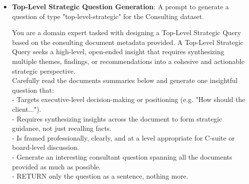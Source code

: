 \documentclass[12pt,twoside]{report}
\begin{document}
\begin{itemize}
\begin{colquote}
    Carefully read the document summary below and generate one well-structured question that: \\
    - Requires aggregation, such as averaging, totaling, or summarizing metrics across time periods, business units, or case examples. \\
    - May involve either numerical aggregation (e.g. averages, totals, trends) or conceptual aggregation (e.g. common success factors across initiatives). \\
    - Is professionally worded, precise, and answerable using the document's content. \\
    - Generate an interesting consultant question spanning all the documents provided as much as possible. \\
    - RETURN only the question as a sentence, nothing more. \\

    Examples: \\
    - "Calculate the average EBITDA improvement for retail firms implementing cost-cutting initiatives as recommended in Deloitte's 2021 and 2022 reports." \\
    - "What are the most commonly cited success factors for digital transformation across Bain's 2022 and 2023 strategy reports?" \\

    The documents information: \\
    \{topics_and_summaries\}
    \end{colquote}

    \item \textbf{Top-Level Strategic Question Generation}: A prompt to generate a question of type "top-level-strategic" for the Consulting dataset.
    \begin{colquote}
    You are a domain expert tasked with designing a Top-Level Strategic Query based on the consulting document metadata provided. A Top-Level Strategic Query seeks a high-level, open-ended insight that requires synthesizing multiple themes, findings, or recommendations into a cohesive and actionable strategic perspective. \\

    Carefully read the documents summaries below and generate one insightful question that: \\
    - Targets executive-level decision-making or positioning (e.g. "How should the client..."). \\
    - Requires synthesizing insights across the document to form strategic guidance, not just recalling facts. \\
    - Is framed professionally, clearly, and at a level appropriate for C-suite or board-level discussion. \\
    - Generate an interesting consultant question spanning all the documents provided as much as possible. \\
    - RETURN only the question as a sentence, nothing more. \\


\end{colquote}
\end{itemize}
\end{document}
